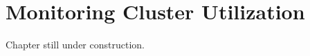 \chapter{Monitoring Cluster Utilization}
\label{ch:monitoring-cluster-utilization}

Chapter still under construction.

